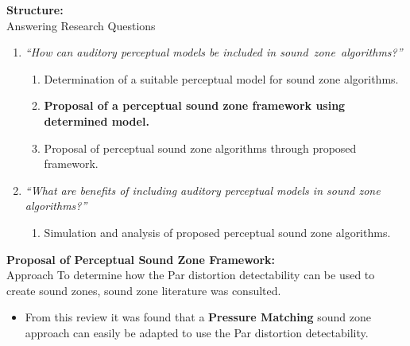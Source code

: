 \documentclass[aspectratio=169]{beamer}
\begin{document}
\begin{frame}{\textbf{Structure:}\\ Answering Research Questions}
    \begin{enumerate}
        \item {\textit{``How can auditory perceptual models be included in sound~zone~algorithms?''}}
            \vspace{7pt}
            \begin{enumerate}
                \item Determination of a suitable perceptual model for sound zone algorithms.
                \vspace{7pt}
                \item \textbf{Proposal of a perceptual sound zone framework using determined model. }
                \vspace{7pt}
                \item Proposal of perceptual sound zone algorithms through proposed framework.
                \vspace{7pt}
            \end{enumerate}
        \item {\textit{``What are benefits of including auditory perceptual models in sound zone algorithms?''}}
            \vspace{-5pt}
            \begin{enumerate}
                \item Simulation and analysis of proposed perceptual sound zone algorithms.
            \end{enumerate}
    \end{enumerate}
\end{frame}

\begin{frame}{\textbf{Proposal of Perceptual Sound Zone Framework:}\\ Approach}
    To determine how the Par distortion detectability can be used to create sound zones, sound zone literature was consulted.\\
    \vspace{10pt}
    \begin{itemize}
        \item From this review it was found that a \textbf{Pressure Matching} sound zone approach can easily be adapted to 
                use the Par distortion detectability.
    \end{itemize}
\end{frame}
\end{document}
